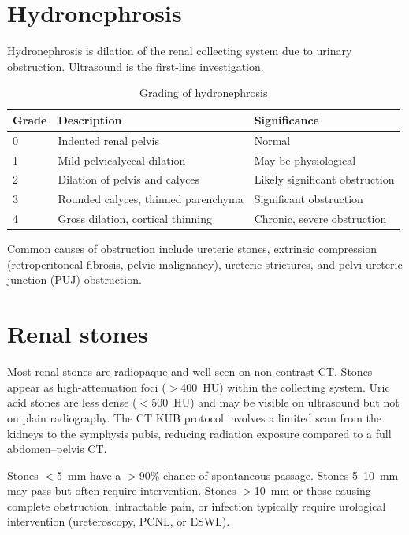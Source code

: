 \section{Hydronephrosis}
Hydronephrosis is dilation of the renal collecting system due to urinary obstruction. Ultrasound is the first-line investigation.

\begin{table}[h]
\centering
\caption{Grading of hydronephrosis}
\label{tab:hydronephrosis}
\begin{tabular}{lll}
\hline
\textbf{Grade} & \textbf{Description} & \textbf{Significance} \\
\hline
0 & Indented renal pelvis & Normal \\
1 & Mild pelvicalyceal dilation & May be physiological \\
2 & Dilation of pelvis and calyces & Likely significant obstruction \\
3 & Rounded calyces, thinned parenchyma & Significant obstruction \\
4 & Gross dilation, cortical thinning & Chronic, severe obstruction \\
\hline
\end{tabular}
\end{table}

Common causes of obstruction include ureteric stones, extrinsic compression (retroperitoneal fibrosis, pelvic malignancy), ureteric strictures, and pelvi-ureteric junction (PUJ) obstruction.

\section{Renal stones}
Most renal stones are radiopaque and well seen on non-contrast CT. Stones appear as high-attenuation foci ($>$400~HU) within the collecting system. Uric acid stones are less dense ($<$500~HU) and may be visible on ultrasound but not on plain radiography. The CT KUB protocol involves a limited scan from the kidneys to the symphysis pubis, reducing radiation exposure compared to a full abdomen--pelvis CT.

\begin{pearlbox}
Stones $<$5~mm have a $>$90\% chance of spontaneous passage. Stones 5--10~mm may pass but often require intervention. Stones $>$10~mm or those causing complete obstruction, intractable pain, or infection typically require urological intervention (ureteroscopy, PCNL, or ESWL).
\end{pearlbox}


